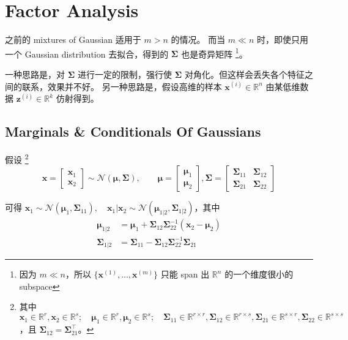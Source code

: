 \chapter{Factor Analysis}
	之前的 mixtures of Gaussian 适用于 $ m > n $ 的情况。
	而当 $ m \ll n $ 时，即使只用一个 Gaussian distribution 去拟合，得到的 $ \bm{\Sigma} $ 也是奇异矩阵
	\footnote{因为 $ m \ll n $，所以 $ \{ \bm{x}^{(1)}, \ldots, \bm{x}^{(m)} \} $ 只能 span 出 $ \mathbb{R}^n $ 的一个维度很小的 subspace }。
	
	一种思路是，对 $ \bm{\Sigma} $ 进行一定的限制，强行使 $ \bm{\Sigma} $ 对角化。但这样会丢失各个特征之间的联系，效果并不好。
	另一种思路是，假设高维的样本 $ \bm{x}^{(i)} \in \mathbb{R}^n $ 由某低维数据 $ \bm{z}^{(i)} \in \mathbb{R}^k $ 仿射得到。
	
	\section{Marginals \& Conditionals Of Gaussians}
		假设
		\footnote{其中 $ \bm{x}_1 \in \mathbb{R}^r, \bm{x}_2 \in \mathbb{R}^s; \quad \bm{\mu}_1 \in \mathbb{R}^r, \bm{\mu}_2 \in \mathbb{R}^s; \quad \bm{\Sigma}_{11} \in \mathbb{R}^{r \times r}, \bm{\Sigma}_{12} \in \mathbb{R}^{r \times s}, \bm{\Sigma}_{21} \in \mathbb{R}^{s \times r}, \bm{\Sigma}_{22} \in \mathbb{R}^{s \times s} $，且 $ \bm{\Sigma}_{12} = \bm{\Sigma}_{21}^\intercal $。}
		\begin{equation*}
			\bm{x} = 
			\begin{bmatrix}
				\bm{x}_1 \\
				\bm{x}_2
			\end{bmatrix}
			\sim \mathcal{N}(\bm{\mu}, \bm{\Sigma}), \qquad \bm{\mu} = 
			\begin{bmatrix}
				\bm{\mu}_1 \\
				\bm{\mu}_2
			\end{bmatrix}
			, \bm{\Sigma} = 
			\begin{bmatrix}
				\bm{\Sigma}_{11} & \bm{\Sigma}_{12} \\
				\bm{\Sigma}_{21} & \bm{\Sigma}_{22} 
			\end{bmatrix}
		\end{equation*} 
		
		可得 $ \bm{x}_1 \sim \mathcal{N}(\bm{\mu}_1, \bm{\Sigma}_{11}), \quad \bm{x}_1 | \bm{x}_2 \sim \mathcal{N}(\bm{\mu}_{1|2}, \bm{\Sigma}_{1|2}) $，其中 
		\begin{align}
			\bm{\mu}_{1|2} &= \bm{\mu}_1 + \bm{\Sigma}_{12} \bm{\Sigma}_{22}^{-1} (\bm{x}_2 - \bm{\mu}_2) \\
			\bm{\Sigma}_{1|2} &= \bm{\Sigma}_{11} - \bm{\Sigma}_{12} \bm{\Sigma}_{22}^{-1} \bm{\Sigma}_{21}
		\end{align}
		
